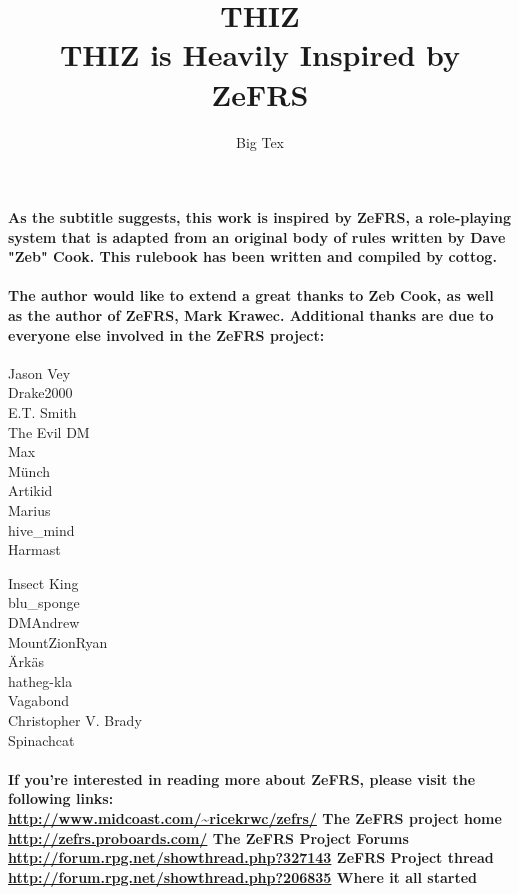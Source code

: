 \documentclass[oneside]{book}
\begin{document}
\frontmatter

\title{ {\Huge THIZ} \\ \vspace{2 mm} {\large THIZ is Heavily Inspired by ZeFRS}}
\date{}
\author{Big Tex}
\maketitle

\paragraph{As the subtitle suggests, this work is inspired by ZeFRS, a role-playing system that is adapted from an original body of rules written by Dave "Zeb" Cook. This rulebook has been written and compiled by cottog.} 

\paragraph{The author would like to extend a great thanks to Zeb Cook, as well as the author of ZeFRS, Mark Krawec. Additional thanks are due to everyone else involved in the ZeFRS project: \\}

\begin{minipage}[t]{0.5\textwidth}
Jason Vey \\
Drake2000 \\ 
E.T. Smith \\
The Evil DM \\
Max \\
M\"{u}nch \\
Artikid \\
Marius \\
hive\_mind \\
Harmast
\end{minipage}
\begin{minipage}[t]{0.5\textwidth}
Insect King \\
blu\_sponge \\
DMAndrew \\
MountZionRyan \\
\"{A}rk\"{a}s \\
hatheg-kla \\
Vagabond \\
Christopher V. Brady \\
Spinachcat
\end{minipage}

\paragraph{If you're interested in reading more about ZeFRS, please visit the following links: \\
\url{http://www.midcoast.com/~ricekrwc/zefrs/} The ZeFRS project home\\
\url{http://zefrs.proboards.com/} The ZeFRS Project Forums \\
\url{http://forum.rpg.net/showthread.php?327143} ZeFRS Project thread \\
\url{http://forum.rpg.net/showthread.php?206835} Where it all started }
\end{document}
